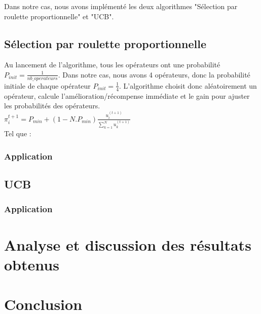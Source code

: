 \documentclass[12pt]{article}
\begin{document}
\par Dans notre cas, nous avons implémenté les deux algorithmes "Sélection par roulette proportionnelle" et "UCB".


	\subsection{Sélection par roulette proportionnelle}
	Au lancement de l'algorithme, tous les opérateurs ont une probabilité $ P_{init} = \frac{1}{nb\_operateurs} $. Dans notre cas, nous avons 4 opérateurs, donc la probabilité initiale de chaque opérateur $ P_{init} = \frac{1}{4} $. L'algorithme choisit donc aléatoirement un opérateur, calcule l'amélioration/récompense immédiate et le gain pour ajuster les probabilités des opérateurs.\\
	$ \pi_i^{t+1} = P_{min} + (1 - N.P_{min} ) \frac{u_i^{(t+1)}}{\sum_{k=1}^N u_k^{(t+1)}} $\\
	Tel que : \\
	
		\subsubsection{Application}
	\subsection{UCB}
		\subsubsection{Application}

\section{Analyse et discussion des résultats obtenus}

\section{Conclusion}
\end{document}
